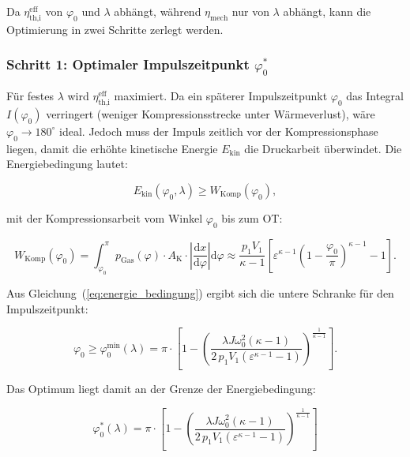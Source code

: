 ﻿\documentclass[a4paper,12pt]{article}
\begin{document}
Da $\eta_\text{th,i}^\text{eff}$ von $\varphi_0$ und $\lambda$ abhängt, während
$\eta_\text{mech}$ nur von $\lambda$ abhängt, kann die Optimierung in zwei Schritte
zerlegt werden.

\subsubsection*{Schritt 1: Optimaler Impulszeitpunkt $\varphi_0^*$}

Für festes $\lambda$ wird $\eta_\text{th,i}^\text{eff}$ maximiert. Da ein späterer
Impulszeitpunkt $\varphi_0$ das Integral $I(\varphi_0)$ verringert (weniger
Kompressionsstrecke unter Wärmeverlust), wäre $\varphi_0 \to 180^\circ$ ideal. Jedoch
muss der Impuls zeitlich vor der Kompressionsphase liegen, damit die erhöhte
kinetische Energie $E_\text{kin}$ die Druckarbeit überwindet. Die Energiebedingung
lautet:

\begin{equation}
  E_\text{kin}(\varphi_0, \lambda) \geq W_\text{Komp}(\varphi_0),
  \label{eq:energie_bedingung}
\end{equation}

\noindent
mit der Kompressionsarbeit vom Winkel $\varphi_0$ bis zum OT:

\begin{equation}
  W_\text{Komp}(\varphi_0) = \int_{\varphi_0}^{\pi}
    p_\text{Gas}(\varphi) \cdot A_\text{K} \cdot
    \left|\frac{\mathrm{d}x}{\mathrm{d}\varphi}\right| \mathrm{d}\varphi
  \approx \frac{p_1 V_1}{\kappa - 1}
    \left[\varepsilon^{\kappa-1}\!\left(1 - \frac{\varphi_0}{\pi}\right)^{\kappa-1}
    - 1\right].
  \label{eq:wkomp}
\end{equation}

Aus Gleichung~(\ref{eq:energie_bedingung}) ergibt sich die untere Schranke
für den Impulszeitpunkt:

\begin{equation}
  \varphi_0 \geq \varphi_0^\text{min}(\lambda) = \pi \cdot
    \left[1 - \left(\frac{\lambda J \omega_0^2 (\kappa{-}1)}{2\,p_1 V_1
    (\varepsilon^{\kappa-1}-1)}\right)^{\!\frac{1}{\kappa-1}}\right].
  \label{eq:phi0_min}
\end{equation}

Das Optimum liegt damit an der Grenze der Energiebedingung:

\begin{equation}
  \boxed{
  \varphi_0^*(\lambda) = \pi \cdot
    \left[1 - \left(\frac{\lambda J \omega_0^2 (\kappa{-}1)}
    {2\,p_1 V_1 (\varepsilon^{\kappa-1}-1)}\right)^{\!\frac{1}{\kappa-1}}\right]
  }
  \label{eq:phi0_opt}
\end{equation}
\end{document}
